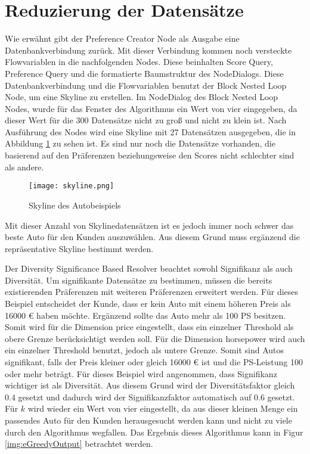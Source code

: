 {\section{Reduzierung der Datensätze}
\label{ch:Evaluierung:sec:repSkyline}
Wie erwähnt gibt der Preference Creator Node als Ausgabe eine Datenbankverbindung zurück. Mit dieser Verbindung kommen noch versteckte Flowvariablen in die nachfolgenden Nodes. Diese beinhalten Score Query, Preference Query und die formatierte Baumstruktur des NodeDialogs. Diese Datenbankverbindung und die Flowvariablen benutzt der Block Nested Loop Node, um eine Skyline zu erstellen. Im NodeDialog des Block Nested Loop Nodes, wurde für das Fenster des Algorithmus ein Wert von vier eingegeben, da dieser Wert für die 300 Datensätze  nicht zu groß und nicht zu klein ist. Nach Ausführung des Nodes wird eine Skyline mit 27 Datensätzen ausgegeben, die in Abbildung \ref{img:skyline} zu sehen ist. Es sind nur noch die Datensätze vorhanden, die basierend auf den Präferenzen  beziehungsweise den Scores nicht schlechter sind als andere.

\begin{figure}[H]
	\centering
	\texttt{[image: skyline.png]}
	\caption{Skyline des Autobeispiels}
	\label{img:skyline}
\end{figure} 

Mit dieser Anzahl von Skylinedatensätzen ist es jedoch immer noch schwer das beste Auto für den Kunden auszuwählen. Aus diesem Grund muss ergänzend die repräsentative Skyline bestimmt werden.

Der Diversity Significance Based Resolver beachtet sowohl Signifikanz als auch Diversität. Um signifikante Datensätze zu bestimmen, müssen die bereits existierenden Präferenzen mit weiteren Präferenzen erweitert werden. Für dieses Beispiel entscheidet der Kunde, dass er kein Auto mit einem höheren Preis als 16000 \euro{} haben möchte. Ergänzend sollte das Auto mehr als 100 PS besitzen. Somit wird für die Dimension price eingestellt, dass ein einzelner Threshold als obere Grenze berücksichtigt werden soll. Für die Dimension horsepower wird auch ein einzelner Threshold benutzt, jedoch als untere Grenze. Somit sind Autos signifikant, falls der Preis kleiner oder gleich 16000 \euro{} ist und die PS-Leistung 100 oder mehr beträgt.
Für dieses Beispiel wird angenommen, dass Signifikanz wichtiger ist als Diversität. Aus diesem Grund wird der Diversitätsfaktor gleich $0.4$ gesetzt und dadurch wird der Signifikanzfaktor automatisch auf $0.6$ gesetzt. Für $k$ wird wieder ein Wert von vier eingestellt, da aus dieser kleinen Menge ein passendes Auto für den Kunden herausgesucht werden kann und nicht zu viele durch den Algorithmus wegfallen. Das Ergebnis dieses Algorithmus kann in Figur \ref{img:eGreedyOutput} betrachtet werden.

}
